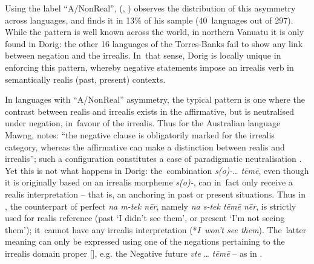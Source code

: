 \documentclass[output=paper,colorlinks,citecolor=brown,draft]{langscibook}
\begin{document}
Using the label “A/NonReal”, \citeauthor{Miestamo2005} (\citeyear[192]{Miestamo2005}, \citeyear{Miestamo2013-wals114}) observes the distribution of this asymmetry across languages, and finds it in 13\% of his sample (40~languages out of 297). While the pattern is well known across the world, in northern Vanuatu it is only found in Dorig: the other 16 languages of the Torres-Banks fail to show any link between negation and the irrealis. In~that sense, Dorig is locally unique in enforcing this pattern, whereby negative statements impose an irrealis verb in semantically realis (past, present) contexts.

In languages with “A/NonReal” asymmetry, the typical pattern is one where the contrast between realis and irrealis exists in the affirmative, but is neutralised under negation, in~favour of the irrealis. Thus for the Australian language Mawng, \citet{Miestamo2013-wals113} notes: “the negative clause is obligatorily marked for the \mbox{irrealis} category, whereas the affirmative can make a distinction between realis and irrealis”; such a configuration constitutes a case of paradigmatic neutralisation \citep[97]{Miestamo2005}.
Yet this is not what happens in Dorig: the~combination \textit{s(o)-}… \textit{tēmē}, even though it is originally based on an irrealis morpheme \textit{s(o)-}, can in~fact only receive a realis interpretation – that is, an anchoring in past or present situations. Thus in , the counterpart of perfect  \textit{na m-tek nēr}, namely  \textit{na s-tek tēmē nēr}, is strictly used for realis reference (past ‘I didn’t see them’, or present ‘I’m not seeing them’); it~cannot have any \mbox{irrealis} interpretation (*\textit{I~won’t see them}). The~latter meaning can only be expressed using one of the negations pertaining to the irrealis domain proper [], e.g. the Negative future \textit{vte} … \textit{tēmē} – as in .
\end{document}
